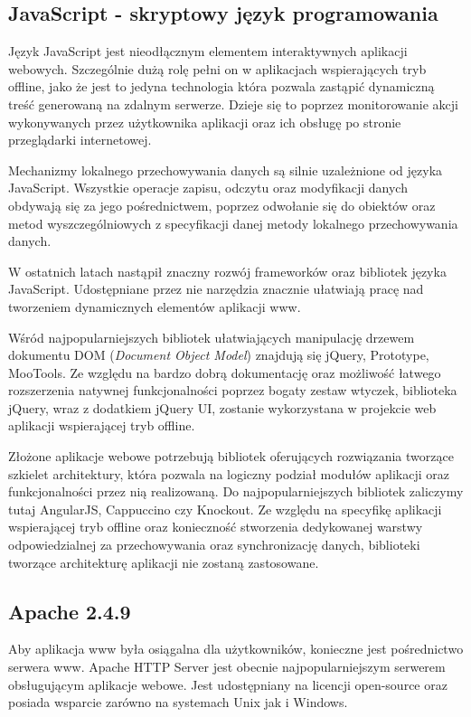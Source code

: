 \subsection{JavaScript - skryptowy język programowania}
\label{sec:js}

Język JavaScript jest nieodłącznym elementem interaktywnych aplikacji webowych. Szczególnie dużą rolę pełni on w aplikacjach wspierających tryb offline, jako że jest to jedyna technologia która pozwala zastąpić dynamiczną treść generowaną na zdalnym serwerze. Dzieje się to poprzez monitorowanie akcji wykonywanych przez użytkownika aplikacji oraz ich obsługę po stronie przeglądarki internetowej.

Mechanizmy lokalnego przechowywania danych są silnie uzależnione od języka JavaScript. Wszystkie operacje zapisu, odczytu oraz modyfikacji danych obdywają się za jego pośrednictwem, poprzez odwołanie się do obiektów oraz metod wyszczególniowych z specyfikacji danej metody lokalnego przechowywania danych.

W ostatnich latach nastąpił znaczny rozwój frameworków oraz bibliotek języka JavaScript. Udostępniane przez nie narzędzia znacznie ułatwiają pracę nad tworzeniem dynamicznych elementów aplikacji www.

Wśród najpopularniejszych bibliotek ułatwiających manipulację drzewem dokumentu DOM (\emph{Document Object Model}) znajdują się jQuery, Prototype, MooTools. Ze względu na bardzo dobrą dokumentację oraz możliwość łatwego rozszerzenia natywnej funkcjonalności poprzez bogaty zestaw wtyczek, biblioteka jQuery, wraz z dodatkiem jQuery UI, zostanie wykorzystana w projekcie web aplikacji wspierającej tryb offline.

Złożone aplikacje webowe potrzebują bibliotek oferujących rozwiązania tworzące szkielet architektury, która pozwala na logiczny podział modułów aplikacji oraz funkcjonalności przez nią realizowaną. Do najpopularniejszych bibliotek zaliczymy tutaj AngularJS, Cappuccino czy Knockout. Ze względu na specyfikę aplikacji wspierającej tryb offline oraz konieczność stworzenia dedykowanej warstwy odpowiedzialnej za przechowywania oraz synchronizację danych, biblioteki tworzące architekturę aplikacji nie zostaną zastosowane.

\subsection{Apache 2.4.9}
\label{sec:apache}

Aby aplikacja www była osiągalna dla użytkowników, konieczne jest pośrednictwo serwera www. Apache HTTP Server jest obecnie najpopularniejszym serwerem obsługującym aplikacje webowe. Jest udostępniany na licencji open-source oraz posiada wsparcie zarówno na systemach Unix jak i Windows.

